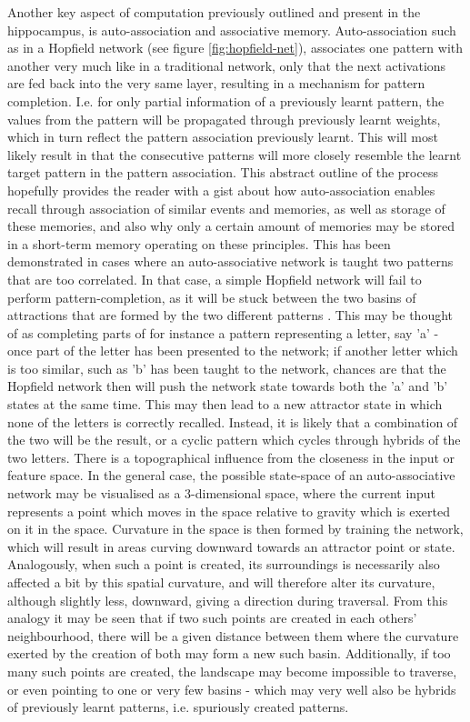 Another key aspect of computation previously outlined and present in the hippocampus, is auto-association and associative memory. Auto-association such as in a Hopfield network (see figure \ref{fig:hopfield-net}), associates one pattern with another very much like in a traditional network, only that the next activations are fed back into the very same layer, resulting in a mechanism for pattern completion. I.e. for only partial information of a previously learnt pattern, the values from the pattern will be propagated through previously learnt weights, which in turn reflect the pattern association previously learnt. This will most likely result in that the consecutive patterns will more closely resemble the learnt target pattern in the pattern association. This abstract outline of the process hopefully provides the reader with a gist about how auto-association enables recall through association of similar events and memories, as well as storage of these memories, and also why only a certain amount of memories may be stored in a short-term memory operating on these principles. This has been demonstrated in cases where an auto-associative network is taught two patterns that are too correlated. In that case, a simple Hopfield network will fail to perform pattern-completion, as it will be stuck between the two basins of attractions that are formed by the two different patterns \citep{Rolls1998chpt3}. This may be thought of as completing parts of for instance a pattern representing a letter, say 'a' - once part of the letter has been presented to the network; if another letter which is too similar, such as 'b' has been taught to the network, chances are that the Hopfield network then will push the network state towards both the 'a' and 'b' states at the same time. This may then lead to a new attractor state in which none of the letters is correctly recalled. Instead, it is likely that a combination of the two will be the result, or a cyclic pattern which cycles through hybrids of the two letters. There is a topographical influence from the closeness in the input or feature space.
In the general case, the possible state-space of an auto-associative network may be visualised as a 3-dimensional space, where the current input represents a point which moves in the space relative to gravity which is exerted on it in the space. Curvature in the space is then formed by training the network, which will result in areas curving downward towards an attractor point or state. Analogously, when such a point is created, its surroundings is necessarily also affected a bit by this spatial curvature, and will therefore alter its curvature, although slightly less, downward, giving a direction during traversal. From this analogy it may be seen that if two such points are created in each others' neighbourhood, there will be a given distance between them where the curvature exerted by the creation of both may form a new such basin. Additionally, if too many such points are created, the landscape may become impossible to traverse, or even pointing to one or very few basins - which may very well also be hybrids of previously learnt patterns, i.e. spuriously created patterns.
